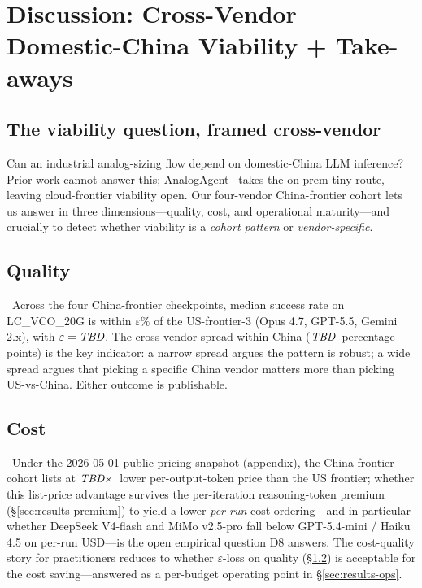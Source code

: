 
\section{Discussion: Cross-Vendor Domestic-China Viability + Take-aways}
\label{sec:discussion}

\subsection{The viability question, framed cross-vendor}
\label{sec:disc-question}

Can an industrial analog-sizing flow depend on domestic-China LLM
inference? Prior work cannot answer this;
AnalogAgent~\cite{analogagent} takes the on-prem-tiny route,
leaving cloud-frontier viability open. Our four-vendor
China-frontier cohort lets us answer in three dimensions---quality,
cost, and operational maturity---and crucially to detect whether
viability is a \emph{cohort pattern} or \emph{vendor-specific}.

\subsection{Quality}
\label{sec:disc-quality}

\tbdeight\ Across the four China-frontier checkpoints, median
success rate on LC\_VCO\_20G is within $\varepsilon\%$ of the
US-frontier-3 (Opus 4.7, GPT-5.5, Gemini 2.x), with $\varepsilon =
\textit{TBD}$. The cross-vendor spread within China
($\textit{TBD}$~percentage points) is the key indicator: a narrow
spread argues the pattern is robust; a wide spread argues that
picking a specific China vendor matters more than picking
US-vs-China. Either outcome is publishable.

\subsection{Cost}
\label{sec:disc-cost}

\tbdeight\ Under the 2026-05-01 public pricing snapshot (appendix),
the China-frontier cohort lists at $\textit{TBD}\times$~lower
per-output-token price than the US frontier; whether this
list-price advantage survives the per-iteration reasoning-token
premium (\S\ref{sec:results-premium}) to yield a lower
\emph{per-run} cost ordering---and in particular whether DeepSeek
V4-flash and MiMo v2.5-pro fall below GPT-5.4-mini / Haiku 4.5 on
per-run USD---is the open empirical question D8 answers. The
cost-quality story for practitioners reduces to whether
$\varepsilon$-loss on quality (\S\ref{sec:disc-quality}) is
acceptable for the cost saving---answered as a per-budget operating
point in \S\ref{sec:results-ops}.

